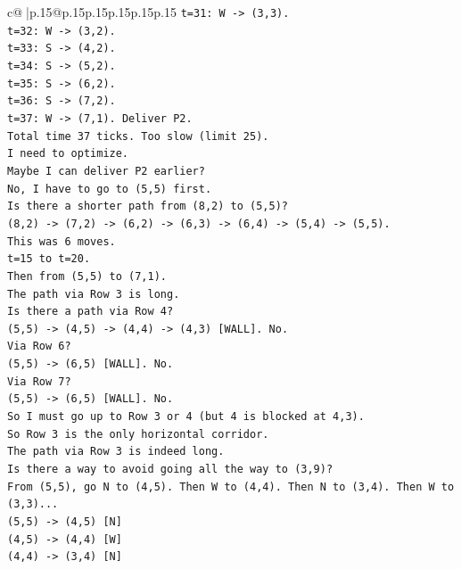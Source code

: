 \documentclass{article}
\begin{document}
{\begin{supertabular}{c@{$\;$}|p{.15\linewidth}@{}p{.15\linewidth}p{.15\linewidth}p{.15\linewidth}p{.15\linewidth}p{.15\linewidth}}
{{{\texttt{t=31: W {-}> (3,3).} \\
\texttt{t=32: W {-}> (3,2).} \\
\texttt{t=33: S {-}> (4,2).} \\
\texttt{t=34: S {-}> (5,2).} \\
\texttt{t=35: S {-}> (6,2).} \\
\texttt{t=36: S {-}> (7,2).} \\
\texttt{t=37: W {-}> (7,1). Deliver P2.} \\
\texttt{Total time 37 ticks. Too slow (limit 25).} \\
\texttt{I need to optimize.} \\
\texttt{Maybe I can deliver P2 earlier?} \\
\texttt{No, I have to go to (5,5) first.} \\
\texttt{Is there a shorter path from (8,2) to (5,5)?} \\
\texttt{(8,2) {-}> (7,2) {-}> (6,2) {-}> (6,3) {-}> (6,4) {-}> (5,4) {-}> (5,5).} \\
\texttt{This was 6 moves.} \\
\texttt{t=15 to t=20.} \\
\texttt{Then from (5,5) to (7,1).} \\
\texttt{The path via Row 3 is long.} \\
\texttt{Is there a path via Row 4?} \\
\texttt{(5,5) {-}> (4,5) {-}> (4,4) {-}> (4,3) {[}WALL{]}. No.} \\
\texttt{Via Row 6?} \\
\texttt{(5,5) {-}> (6,5) {[}WALL{]}. No.} \\
\texttt{Via Row 7?} \\
\texttt{(5,5) {-}> (6,5) {[}WALL{]}. No.} \\
\texttt{So I must go up to Row 3 or 4 (but 4 is blocked at 4,3).} \\
\texttt{So Row 3 is the only horizontal corridor.} \\
\texttt{The path via Row 3 is indeed long.} \\
\texttt{Is there a way to avoid going all the way to (3,9)?} \\
\texttt{From (5,5), go N to (4,5). Then W to (4,4). Then N to (3,4). Then W to (3,3)...} \\
\texttt{(5,5) {-}> (4,5) {[}N{]}} \\
\texttt{(4,5) {-}> (4,4) {[}W{]}} \\
\texttt{(4,4) {-}> (3,4) {[}N{]}} \\
}}}
\end{supertabular}}
\end{document}
